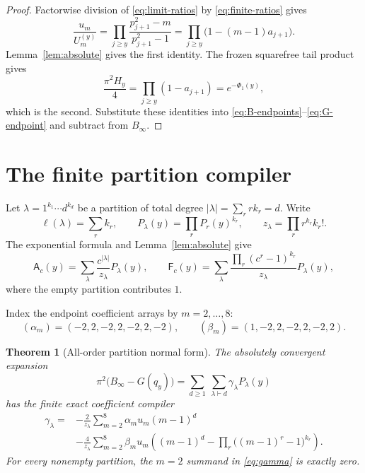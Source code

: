 \documentclass[11pt]{article}
\newtheorem{theorem}{Theorem}[section]
\theoremstyle{definition}
\theoremstyle{remark}
\newcommand{\ellp}{\ell}
\newcommand{\Afun}{\mathsf A}
\newcommand{\Ffun}{\mathsf F}
\begin{document}
\begin{proof}
Factorwise division of \eqref{eq:limit-ratios} by
\eqref{eq:finite-ratios} gives
\[
 \frac{u_m}{U_m^{(y)}}
 =\prod_{j\ge y}\frac{p_{j+1}^2-m}{p_{j+1}^2-1}
 =\prod_{j\ge y}\bigl(1-(m-1)a_{j+1}\bigr).
\]
Lemma~\ref{lem:absolute} gives the first identity.  The frozen squarefree
tail product gives
\[
 \frac{\pi^2H_y}{4}=\prod_{j\ge y}(1-a_{j+1})=e^{-\Phi_1(y)},
\]
which is the second.  Substitute these identities into
\eqref{eq:B-endpoints}--\eqref{eq:G-endpoint} and subtract from
$B_\infty$.
\end{proof}

\section{The finite partition compiler}

Let $\lambda=1^{k_1}\cdots d^{k_d}$ be a partition of total degree
$|\lambda|=\sum_r rk_r=d$.  Write
\begin{equation}
 \ellp(\lambda)=\sum_r k_r,\qquad
 P_\lambda(y)=\prod_rP_r(y)^{k_r},\qquad
 z_\lambda=\prod_r r^{k_r}k_r!.
 \label{eq:partition-data}
\end{equation}
The exponential formula and Lemma~\ref{lem:absolute} give
\begin{equation}
 \Afun_c(y)=\sum_\lambda\frac{c^{|\lambda|}}{z_\lambda}P_\lambda(y),
 \qquad
 \Ffun_c(y)=\sum_\lambda
 \frac{\prod_r(c^r-1)^{k_r}}{z_\lambda}P_\lambda(y),
 \label{eq:partition-AF}
\end{equation}
where the empty partition contributes $1$.

Index the endpoint coefficient arrays by $m=2,\ldots,8$:
\begin{equation}
 (\alpha_m)=(-2,2,-2,2,-2,2,-2),\qquad
 (\beta_m)=(1,-2,2,-2,2,-2,2).
 \label{eq:alpha-beta}
\end{equation}

\begin{theorem}[All-order partition normal form]
\label{thm:partition}
The absolutely convergent expansion
\begin{equation}
 \pi^2\bigl(B_\infty-G(q_y)\bigr)
 =\sum_{d\ge1}\ \sum_{\lambda\vdash d}
 \gamma_\lambda P_\lambda(y)
 \label{eq:partition-normal-form}
\end{equation}
has the finite exact coefficient compiler
\begin{equation}
\boxed{\begin{aligned}
 \gamma_\lambda={}&-\frac2{z_\lambda}
   \sum_{m=2}^8\alpha_m u_m(m-1)^d\\
 &-\frac4{z_\lambda}\sum_{m=2}^8\beta_m u_m
 \left((m-1)^d-\prod_r\bigl((m-1)^r-1\bigr)^{k_r}\right).
\end{aligned}}
 \label{eq:gamma}
\end{equation}
For every nonempty partition, the $m=2$ summand in
\eqref{eq:gamma} is exactly zero.
\end{theorem}
\end{document}
